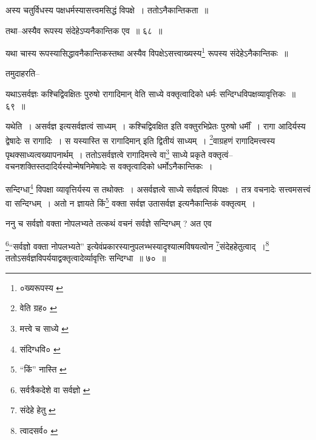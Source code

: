 \documentclass[article,12pt,a4paper]{memoir}
\begin{document}
	  \pstart अस्य चतुर्विधस्य पक्षधर्मस्यासत्त्वमसिद्धं विपक्षे । ततोऽनैकान्तिकता ॥
	\pend
       
	  \bigskip
	  \begingroup
	

	  \pstart तथा--अस्यैव रूपस्य संदेहेऽप्यनैकान्तिक एव ॥ ६८ ॥
	\pend
      
	  \endgroup
	 

	  \pstart यथा चास्य रूपस्यासिद्धावनैकान्तिकस्तथा अस्यैव विपक्षेऽसत्त्वाख्यस्य\footnote{०ख्यरूपस्य \cite{dp-msC}} रूपस्य संदेहेऽनैकान्तिकः ॥
	\pend
       

	  \pstart तमुदाहरति--
	\pend
       
	  \bigskip
	  \begingroup
	

	  \pstart यथाऽसर्वज्ञः कश्चिद्विवक्षितः पुरुषो रागादिमान् वेति साध्ये वक्तृत्वादिको धर्मः सन्दिग्धविपक्षव्यावृत्तिकः ॥ ६९ ॥
	\pend
      
	  \endgroup
	 

	  \pstart यथेति । असर्वज्ञ इत्यसर्वज्ञत्वं साध्यम् । कश्चिद्विवक्षित इति वक्तुरभिप्रेतः पुरुषो धर्मीं । रागा आदिर्यस्य द्वेषादेः स रागादिः । स यस्यास्ति स रागादिमान् इति द्वितीयं साध्यम् । \footnote{वेति ग्रह० \cite{dp-msC} \cite{dp-msD}}वाग्रहणं रागादिमत्त्वस्य पृथक्साध्यत्वख्यापनार्थम् । ततोऽसर्वज्ञत्वे रागादिमत्त्वे वा\footnote{मत्त्वे च साध्ये \cite{dp-msC}} साध्ये प्रकृते वक्तृत्वं--वचनशक्तिस्तदादिर्यस्योन्मेषनिमेषादेः स वक्तृत्वादिको धर्मोऽनैकान्तिकः ।
	\pend
       

	  \pstart सन्दिग्धा\footnote{संदिग्धवि० \cite{dp-msB}} विपक्षा व्यावृत्तिर्यस्य स तथोक्तः । असर्वज्ञत्वे साध्ये सर्वज्ञत्वं विपक्षः । तत्र वचनादेः सत्त्वमसत्त्वं वा सन्दिग्धम् । अतो न ज्ञायते किं\footnote{“किं” नास्ति \cite{dp-msA} \cite{dp-msB} \cite{dp-msD} \cite{dp-edP} \cite{dp-edH} \cite{dp-edE} \cite{dp-edN}} वक्ता सर्वज्ञ उतासर्वज्ञ इत्यनैकान्तिकं वक्तृत्वम् ।
	\pend
       

	  \pstart ननु च सर्वज्ञो वक्ता नोपलभ्यते तत्कथं वचनं सर्वज्ञे सन्दिग्धम् ? अत एव
	\pend
       
	  \bigskip
	  \begingroup
	

	  \pstart \footnote{सर्वत्रैकदेशे वा सर्वज्ञो \cite{dp-msB} \cite{dp-edP} \cite{dp-edH}}“सर्वज्ञो वक्ता नोपलभ्यते” इत्येवंप्रकारस्यानुपलभ्भस्यादृश्यात्मविषयत्वोन \footnote{संदेहे हेतु \cite{dp-msB} \cite{dp-edP} \cite{dp-edH} \cite{dp-edE}}संदेहहेतुत्वाद् ।\footnote{त्वादसर्व० \cite{dp-msB} \cite{dp-msD} \cite{dp-edP} \cite{dp-edH} \cite{dp-edE}} ततोऽसर्वज्ञविपर्ययाद्वक्तृत्वादेर्व्यावृत्तिः सन्दिग्धा ॥ ७० ॥
	\pend
      
	  \endgroup
	 
\end{document}
